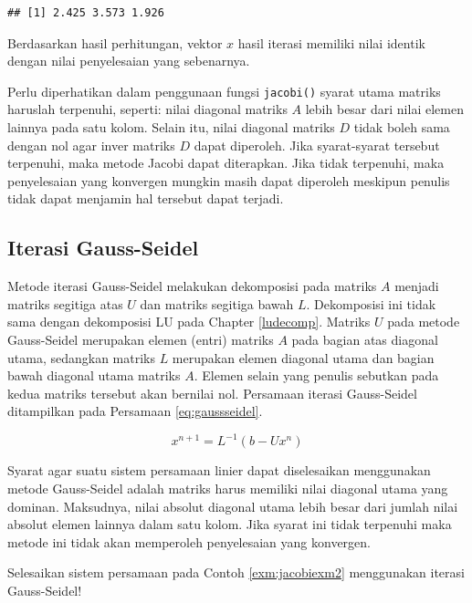 \documentclass[]{book}
\theoremstyle{definition}
\theoremstyle{definition}
\theoremstyle{definition}
\theoremstyle{remark}
\let\BeginKnitrBlock\begin \let\EndKnitrBlock\end
\begin{document}
\begin{verbatim}
## [1] 2.425 3.573 1.926
\end{verbatim}

Berdasarkan hasil perhitungan, vektor \(x\) hasil iterasi memiliki nilai identik dengan nilai penyelesaian yang sebenarnya.

Perlu diperhatikan dalam penggunaan fungsi \texttt{jacobi()} syarat utama matriks haruslah terpenuhi, seperti: nilai diagonal matriks \(A\) lebih besar dari nilai elemen lainnya pada satu kolom. Selain itu, nilai diagonal matriks \(D\) tidak boleh sama dengan nol agar inver matriks \(D\) dapat diperoleh. Jika syarat-syarat tersebut terpenuhi, maka metode Jacobi dapat diterapkan. Jika tidak terpenuhi, maka penyelesaian yang konvergen mungkin masih dapat diperoleh meskipun penulis tidak dapat menjamin hal tersebut dapat terjadi.

\hypertarget{seideliter}{%
\subsection{Iterasi Gauss-Seidel}\label{seideliter}}

Metode iterasi Gauss-Seidel melakukan dekomposisi pada matriks \(A\) menjadi matriks segitiga atas \(U\) dan matriks segitiga bawah \(L\). Dekomposisi ini tidak sama dengan dekomposisi LU pada Chapter \ref{ludecomp}. Matriks \(U\) pada metode Gauss-Seidel merupakan elemen (entri) matriks \(A\) pada bagian atas diagonal utama, sedangkan matriks \(L\) merupakan elemen diagonal utama dan bagian bawah diagonal utama matriks \(A\). Elemen selain yang penulis sebutkan pada kedua matriks tersebut akan bernilai nol. Persamaan iterasi Gauss-Seidel ditampilkan pada Persamaan \eqref{eq:gaussseidel}.

\begin{equation}
x^{n+1}=L^{-1}\left(b-Ux^{n}\right)
 \label{eq:gaussseidel}
\end{equation}

Syarat agar suatu sistem persamaan linier dapat diselesaikan menggunakan metode Gauss-Seidel adalah matriks harus memiliki nilai diagonal utama yang dominan. Maksudnya, nilai absolut diagonal utama lebih besar dari jumlah nilai absolut elemen lainnya dalam satu kolom. Jika syarat ini tidak terpenuhi maka metode ini tidak akan memperoleh penyelesaian yang konvergen.

\BeginKnitrBlock{example}
\protect\hypertarget{exm:gaussseidelexm}{}{\label{exm:gaussseidelexm} }Selesaikan sistem persamaan pada Contoh \ref{exm:jacobiexm2} menggunakan iterasi Gauss-Seidel!
\EndKnitrBlock{example}
\end{document}
